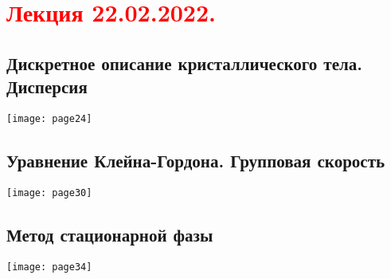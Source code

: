 \documentclass[main.tex]{subfiles}
\begin{document}
\section{\textcolor{red}{Лекция 22.02.2022.}}

\subsection{Дискретное описание кристаллического тела. Дисперсия}
\texttt{[image: page24]}






\subsection{Уравнение Клейна-Гордона. Групповая скорость}

\texttt{[image: page30]}




\subsection{Метод стационарной фазы}
\texttt{[image: page34]}

\end{document}
